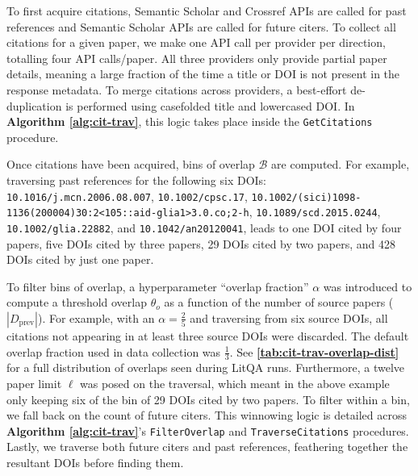 \documentclass{article}
\begin{document}
To first acquire citations, Semantic Scholar \cite{semantic-scholar} and Crossref \cite{crossref} APIs are called for past references and Semantic Scholar APIs are called for future citers. To collect all citations for a given paper, we make one API call per provider per direction, totalling four API calls/paper. All three providers only provide partial paper details, meaning a large fraction of the time a title or DOI is not present in the response metadata. To merge citations across providers, a best-effort de-duplication is performed using casefolded title and lowercased DOI. In \textbf{Algorithm \ref{alg:cit-trav}}, this logic takes place inside the \texttt{GetCitations} procedure.

Once citations have been acquired, bins of overlap $\mathcal{B}$ are computed. For example, traversing past references for the following six DOIs:
\texttt{10.1016/j.mcn.2006.08.007}, \texttt{10.1002/cpsc.17}, \texttt{10.1002/(sici)1098- 1136(200004)30:2<105::aid-glia1>3.0.co;2-h}, \texttt{10.1089/scd.2015.0244}, \texttt{10.1002/glia.22882}, and \texttt{10.1042/an20120041},
leads to one DOI cited by four papers, five DOIs cited by three papers, 29 DOIs cited by two papers, and 428 DOIs cited by just one paper.

To filter bins of overlap, a hyperparameter ``overlap fraction'' $\alpha$ was introduced to compute a threshold overlap $\theta_o$ as a function of the number of source papers ($|D_\text{prev}|$). For example, with an $\alpha = \frac{2}{5}$ and traversing from six source DOIs, all citations not appearing in at least three source DOIs were discarded. The default overlap fraction used in data collection was $\frac{1}{3}$. See \textbf{\autoref{tab:cit-trav-overlap-dist}} for a full distribution of overlaps seen during LitQA runs. Furthermore, a twelve paper limit $\ell$ was posed on the traversal, which meant in the above example only keeping six of the bin of 29 DOIs cited by two papers. To filter within a bin, we fall back on the count of future citers. This winnowing logic is detailed across \textbf{Algorithm \ref{alg:cit-trav}}'s \texttt{FilterOverlap} and \texttt{TraverseCitations} procedures. Lastly, we traverse both future citers and past references, feathering together the resultant DOIs before finding them. 

\end{document}
